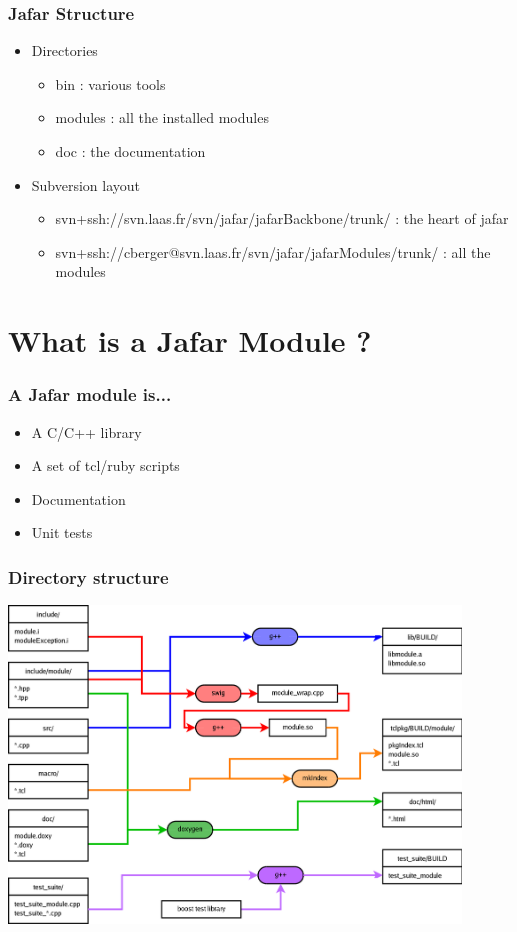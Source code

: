\documentclass[compress]{beamer}
\begin{document}
\begin{frame}
 \frametitle{Jafar Structure}
 \begin{itemize}
  \item<1-> Directories
    \begin{itemize}
     \item<2-> bin : various tools
     \item<3-> modules : all the installed modules
     \item<4-> doc : the documentation
    \end{itemize}
  \item<5-> Subversion layout
    \begin{itemize}
     \item<6-> svn+ssh://svn.laas.fr/svn/jafar/jafarBackbone/trunk/ : the heart
of jafar
     \item<7-> svn+ssh://cberger@svn.laas.fr/svn/jafar/jafarModules/trunk/ :
all the modules
    \end{itemize}
 \end{itemize}
\end{frame}


\section{What is a Jafar Module ?}
\begin{frame}
  \frametitle{A Jafar module is...}
  \begin{itemize}
   \item<1-> A C/C++ library
   \item<2-> A set of tcl/ruby scripts
   \item<3-> Documentation
   \item<4-> Unit tests
  \end{itemize}
\end{frame}
\begin{frame}
  \frametitle{Directory structure}
  \begin{center}
    \includegraphics[width=0.9\textwidth]{jafarModule.png}
  \end{center}
\end{frame}
\end{document}
